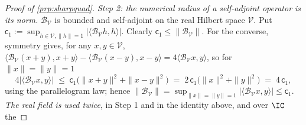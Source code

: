 \begin{proof}[Proof of \cref{prp:sharpquad}]
\emph{Step 2: the numerical radius of a self-adjoint operator is its norm.} $\mathcal B_{\mathcal V}$ is
bounded and self-adjoint on the real Hilbert space $\mathcal V$. Put
$\mathsf c_1:=\sup_{h\in\mathcal V,\|h\|=1}|\langle\mathcal B_{\mathcal V}h,h\rangle|$. Clearly
$\mathsf c_1\le\|\mathcal B_{\mathcal V}\|$. For the converse, symmetry gives, for any $x,y\in\mathcal V$,
$\langle\mathcal B_{\mathcal V}(x+y),x+y\rangle-\langle\mathcal B_{\mathcal V}(x-y),x-y\rangle
=4\langle\mathcal B_{\mathcal V}x,y\rangle$, so for $\|x\|=\|y\|=1$
\[
4\big|\big\langle\mathcal B_{\mathcal V}x,y\big\rangle\big|
\;\le\;\mathsf c_1\big(\|x+y\|^{2}+\|x-y\|^{2}\big)
\;=\;2\,\mathsf c_1\big(\|x\|^{2}+\|y\|^{2}\big)\;=\;4\,\mathsf c_1 ,
\]
using the parallelogram law; hence
$\|\mathcal B_{\mathcal V}\|=\sup_{\|x\|=\|y\|=1}|\langle\mathcal B_{\mathcal V}x,y\rangle|\le\mathsf c_1$.
\emph{The real field is used twice}, in Step 1 and in the identity above, and over $\IC$ the

\end{proof}
